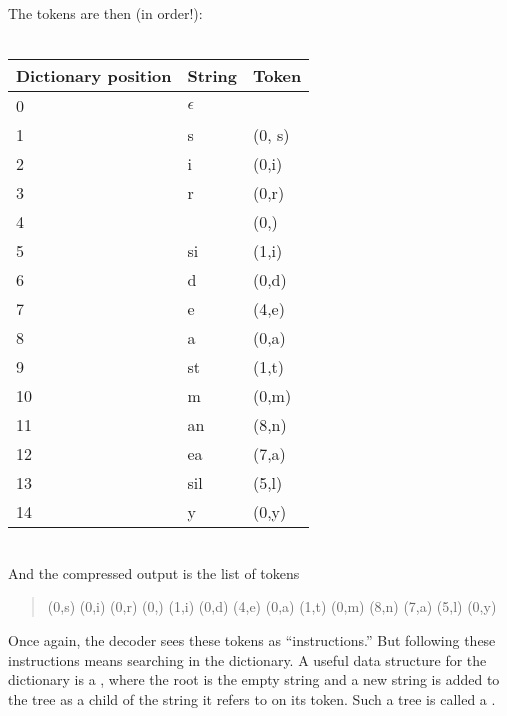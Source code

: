 The tokens are then (in order!):\\
~\\
\begin{tabular}{l|l|l}
     Dictionary position    & String    & Token  \\
     \hline
     0                      &  $\epsilon$         &        \\
     1                        & s           &  (0, s)      \\
     2                   & i          & (0,i)       \\
     3                   &  r         & (0,r)       \\
     4                   &  \textvisiblespace         & (0,\textvisiblespace)       \\
     5                   &  si         &    (1,i)    \\
     6                   &  d         & (0,d)       \\
     7                   &  \textvisiblespace e         &  (4,e)      \\
     8                   &  a         & (0,a)       \\
     9                   &  st         &    (1,t)    \\
     10                   & m          &    (0,m)    \\
     11                   & an          &   (8,n)     \\
     12                   & \textvisiblespace ea          & (7,a)       \\
     13                   & sil          &  (5,l)      \\
     14                   & y          &    (0,y)    
\end{tabular}
~\\
And the compressed output is the list of tokens
\begin{quote}
    (0,s) (0,i) (0,r) (0,\textvisiblespace) (1,i) (0,d) (4,e) (0,a) (1,t) (0,m) (8,n) (7,a) (5,l) (0,y)
\end{quote}

Once again, the decoder sees these tokens as ``instructions.'' But following these instructions means searching in the dictionary. A useful data structure for the dictionary is a , where the root is the empty string and a new string is added to the tree as a child of the string it refers to on its token. Such a tree is called a .

